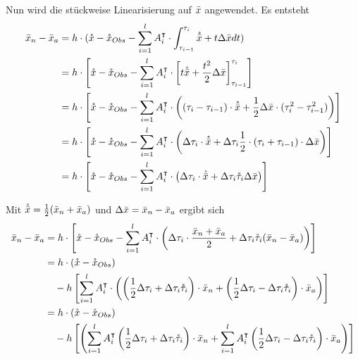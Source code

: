 Nun wird die stückweise Linearisierung auf $\bar{x}$ angewendet. Es entsteht
\allowdisplaybreaks
\begin{align*}
\bar{x}_n - \bar{x}_a &= h\cdot (\mathring{x} -\mathring{x}_{Obs} - \sum_{i=1}^l A_i^\intercal \cdot \int_{\tau_{i-1}}^{\tau_{i}} \mathring{\bar{x}} + t\Delta \bar{x} dt)\\
		  &= h\cdot \left[\mathring{x} -\mathring{x}_{Obs} - \sum_{i=1}^l A_i^\intercal \cdot \left[t\mathring{\bar{x}} + \frac{t^2}{2}\Delta \bar{x} \right]_{\tau_{i-1}}^{\tau_i} \right]\\
		  &= h\cdot \left[\mathring{x} -\mathring{x}_{Obs} - \sum_{i=1}^l A_i^\intercal \cdot \left( (\tau_i - \tau_{i-1})\cdot \mathring{\bar{x}} + \frac{1}{2}\Delta \bar{x} \cdot(\tau_i^2-\tau_{i-1}^2) \right)\right]\\
		  &= h\cdot \left[\mathring{x} -\mathring{x}_{Obs} - \sum_{i=1}^l A_i^\intercal \cdot \left(\Delta \tau_i\cdot \mathring{\bar{x}} +  \Delta \tau_i \frac{1}{2}\cdot(\tau_i+\tau_{i-1})\cdot \Delta \bar{x} \right)\right]\\
		  &= h\cdot \left[\mathring{x} -\mathring{x}_{Obs} - \sum_{i=1}^l A_i^\intercal \cdot \left( \Delta \tau_i\cdot \mathring{\bar{x}} +  \Delta \tau_i \mathring{\tau}_i \Delta \bar{x} \right)\right]
\end{align*}

Mit $\mathring{\bar{x}} =\frac{1}{2}(\bar{x}_n + \bar{x}_a) $ und $\Delta \bar{x} =\bar{x}_n - \bar{x}_a $ ergibt sich
\allowdisplaybreaks
\begin{align*}
\bar{x}_n - \bar{x}_a &= h\cdot \left[\mathring{x} -\mathring{x}_{Obs} - \sum_{i=1}^l A_i^\intercal \cdot \left( \Delta \tau_i\cdot \frac{\bar{x}_n + \bar{x}_a}{2} +  \Delta \tau_i \mathring{\tau}_i (\bar{x}_n - \bar{x}_a) \right)\right]\\
 &= h\cdot \left(\mathring{x} -\mathring{x}_{Obs}\right) \\
 &\quad-h\left[\sum_{i=1}^l A_i^\intercal \cdot \left( \left(\frac{1}{2} \Delta \tau_i +\Delta \tau_i \mathring{\tau}_i\right) \cdot \bar{x}_n  +  \left(\frac{1}{2}\Delta \tau_i-\Delta \tau_i \mathring{\tau}_i\right) \cdot \bar{x}_a \right)\right]\\
 &= h\cdot \left(\mathring{x} -\mathring{x}_{Obs} \right)\\
 &\quad-h \left[\left( \sum_{i=1}^l A_i^\intercal \left(\frac{1}{2} \Delta \tau_i +\Delta \tau_i \mathring{\tau}_i\right) \cdot \bar{x}_n  + \sum_{i=1}^l A_i^\intercal  \left(\frac{1}{2}\Delta \tau_i-\Delta \tau_i \mathring{\tau}_i\right) \cdot \bar{x}_a \right)\right]\\
\end{align*}
 
